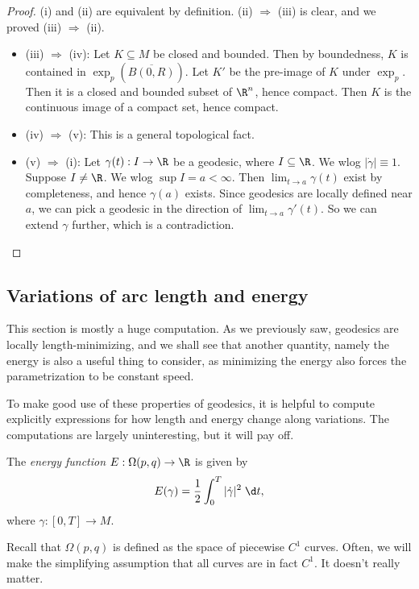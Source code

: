 \documentclass[a4paper]{article}
\begin{document}
\begin{proof}
  (i) and (ii) are equivalent by definition. (ii) $\Rightarrow$ (iii) is clear, and we proved (iii) $\Rightarrow$ (ii).

  \begin{itemize}
    \item (iii) $\Rightarrow$ (iv): Let $K \subseteq M$ be closed and bounded. Then by boundedness, $K$ is contained in $\exp_p(\overline{B(0, R)})$. Let $K'$ be the pre-image of $K$ under $\exp_p$. Then it is a closed and bounded subset of $\R^n$, hence compact. Then $K$ is the continuous image of a compact set, hence compact.
    \item (iv) $\Rightarrow$ (v): This is a general topological fact.
    \item (v) $\Rightarrow$ (i): Let $\gamma(t): I \to \R$ be a geodesic, where $I \subseteq \R$. We wlog $|\dot{\gamma}| \equiv 1$. Suppose $I \not= \R$. We wlog $\sup I = a < \infty$. Then $\lim_{t \to a} \gamma(t)$ exist by completeness, and hence $\gamma(a)$ exists. Since geodesics are locally defined near $a$, we can pick a geodesic in the direction of $\lim_{t \to a} \gamma'(t)$. So we can extend $\gamma$ further, which is a contradiction.
  \end{itemize}
\end{proof}

\subsection{Variations of arc length and energy}
This section is mostly a huge computation. As we previously saw, geodesics are locally length-minimizing, and we shall see that another quantity, namely the energy is also a useful thing to consider, as minimizing the energy also forces the parametrization to be constant speed.

To make good use of these properties of geodesics, it is helpful to compute explicitly expressions for how length and energy change along variations. The computations are largely uninteresting, but it will pay off.

\begin{defi}[Energy]
  The \emph{energy function} $E: \Omega(p, q) \to \R$ is given by
  \[
    E(\gamma) = \frac{1}{2} \int_0^T|\dot{\gamma}|^2\;\d t,
  \]
  where $\gamma: [0, T] \to M$.
\end{defi}
Recall that $\Omega(p, q)$ is defined as the space of piecewise $C^1$ curves. Often, we will make the simplifying assumption that all curves are in fact $C^1$. It doesn't really matter.
\end{document}
